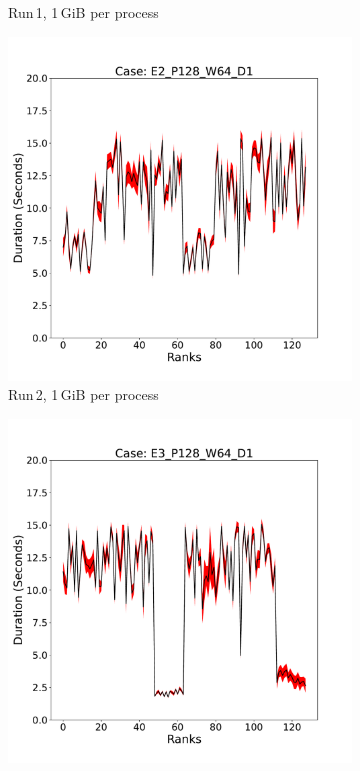 \begin{figure}
\begin{subfigure}[b]{0.3\textwidth}
         \caption{Run\,1, 1\,GiB per process}
         \label{fig:E1_1_d2}
     \end{subfigure}
     \hfill
     \begin{subfigure}[b]{0.3\textwidth}
         \centering
         \includegraphics[width=\textwidth, height=\textwidth]{figures/deisa2__E2_P128_W64_D1.pdf}
         \caption{Run\,2, 1\,GiB per process}
         \label{fig:E2_1_d2}
     \end{subfigure}
      \hfill
     \begin{subfigure}[b]{0.3\textwidth}
         \centering
         \includegraphics[width=\textwidth, height=\textwidth]{figures/deisa2__E3_P128_W64_D1.pdf}

\end{subfigure}
\end{figure}
